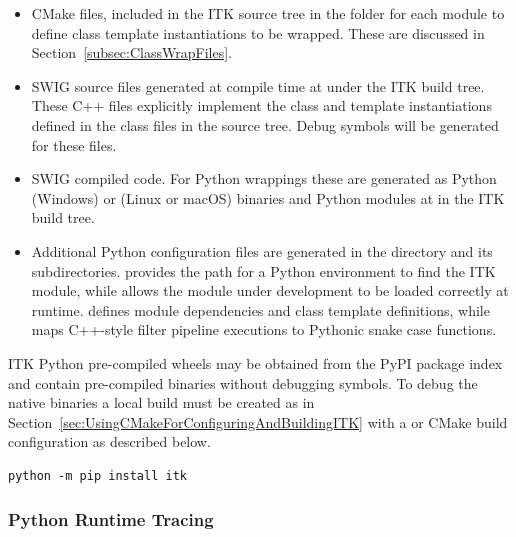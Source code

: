 \begin{itemize}

\item {} CMake files, included in the ITK source tree in the 
folder for each module to define class template instantiations to be wrapped.
These are discussed in Section~\ref{subsec:ClassWrapFiles}.

\item SWIG  source files generated at compile time at 
under the ITK build tree. These C++ files explicitly implement the class and template
instantiations defined in the class  files in the source tree.
Debug symbols will be generated for these files.

\item SWIG compiled code. For Python wrappings these are generated as Python
 (Windows) or  (Linux or macOS) binaries and Python  modules at
 in the ITK build tree.

\item Additional Python configuration files are generated in the
 directory and its subdirectories.
 provides the path for a Python environment to find the ITK
module, while  allows the module under development to be loaded correctly at
runtime.  defines module dependencies and class
template definitions, while  maps
C++-style filter pipeline executions to Pythonic snake case functions.

\end{itemize}

ITK Python pre-compiled wheels may be obtained from the PyPI package index and contain
pre-compiled binaries without debugging symbols. To debug the native binaries a local build
must be created as in Section~\ref{sec:UsingCMakeForConfiguringAndBuildingITK} with a
 or  CMake build configuration as described below.

\begin{verbatim}
python -m pip install itk
\end{verbatim}


\subsubsection{Python Runtime Tracing}%
\label{subsubsec:PythonRuntimeTracing}

